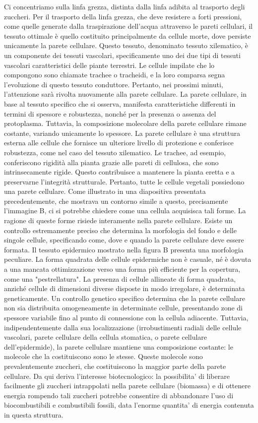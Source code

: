 \documentclass[11pt, a4paper]{article}
\begin{document}
\begin{spacing}{1}
Ci concentriamo sulla linfa grezza, distinta dalla linfa adibita al trasporto degli zuccheri. Per il trasporto della linfa grezza, che deve resistere a forti pressioni, come quelle generate dalla traspirazione dell'acqua attraverso le pareti cellulari, il tessuto ottimale è quello costituito principalmente da cellule morte, dove persiste unicamente la parete cellulare. Questo tessuto, denominato tessuto xilematico, è un componente dei tessuti vascolari, specificamente uno dei due tipi di tessuti vascolari caratteristici delle piante terrestri. Le cellule impilate che lo compongono sono chiamate trachee o tracheidi, e la loro comparsa segna l'evoluzione di questo tessuto conduttore. Pertanto, nei prossimi minuti, l'attenzione sarà rivolta nuovamente alla parete cellulare. La parete cellulare, in base al tessuto specifico che si osserva, manifesta caratteristiche differenti in termini di spessore e robustezza, nonché per la presenza o assenza del protoplasma. Tuttavia, la composizione molecolare della parete cellulare rimane costante, variando unicamente lo spessore.
La parete cellulare è una struttura esterna alle cellule che fornisce un ulteriore livello di protezione e conferisce robustezza, come nel caso del tessuto xilematico. Le trachee, ad esempio, conferiscono rigidità alla pianta grazie alle pareti di cellulosa, che sono intrinsecamente rigide. Questo contribuisce a mantenere la pianta eretta e a preservarne l'integrità strutturale.
Pertanto, tutte le cellule vegetali possiedono una parete cellulare. Come illustrato in una diapositiva presentata precedentemente, che mostrava un contorno simile a questo, precisamente l'immagine B, ci si potrebbe chiedere come una cellula acquisisca tali forme. La ragione di queste forme risiede interamente nella parete cellulare. Esiste un controllo estremamente preciso che determina la morfologia del fondo e delle singole cellule, specificando come, dove e quando la parete cellulare deve essere formata.
Il tessuto epidermico mostrato nella figura B presenta una morfologia peculiare. La forma quadrata delle cellule epidermiche non è casuale, né è dovuta a una mancata ottimizzazione verso una forma più efficiente per la copertura, come una "pestrellatura". La presenza di cellule allineate di forma quadrata, anziché cellule di dimensioni diverse disposte in modo irregolare, è determinata geneticamente.
Un controllo genetico specifico determina che la parete cellulare non sia distribuita omogeneamente in determinate cellule, presentando zone di spessore variabile fino al punto di connessione con la cellula adiacente. Tuttavia, indipendentemente dalla sua localizzazione (irrobustimenti radiali delle cellule vascolari, parete cellulare della cellula stomatica, o parete cellulare dell'epidermide), la parete cellulare mantiene una composizione costante: le molecole che la costituiscono sono le stesse. Queste molecole sono prevalentemente zuccheri, che costituiscono la maggior parte della parete cellulare. Da qui deriva l'interesse biotecnologico: la possibilita' di liberare facilmente gli zuccheri intrappolati nella parete cellulare (biomassa) e di ottenere energia rompendo tali zuccheri potrebbe consentire di abbandonare l'uso di biocombustibili e combustibili fossili, data l'enorme quantita' di energia contenuta in questa struttura.

\end{spacing}
\end{document}
